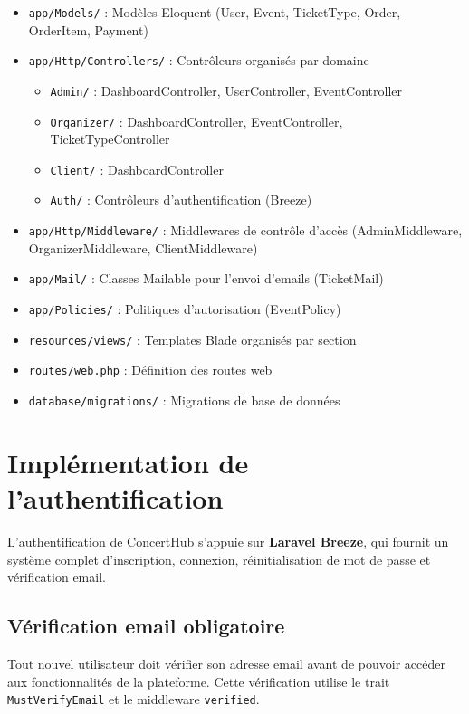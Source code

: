 \documentclass[a4paper,12pt,twoside]{report}
\begin{document}
\begin{itemize}
    \item \texttt{app/Models/} : Modèles Eloquent (User, Event, TicketType, Order, OrderItem, Payment)
    \item \texttt{app/Http/Controllers/} : Contrôleurs organisés par domaine
    \begin{itemize}
        \item \texttt{Admin/} : DashboardController, UserController, EventController
        \item \texttt{Organizer/} : DashboardController, EventController, TicketTypeController
        \item \texttt{Client/} : DashboardController
        \item \texttt{Auth/} : Contrôleurs d'authentification (Breeze)
    \end{itemize}
    \item \texttt{app/Http/Middleware/} : Middlewares de contrôle d'accès (AdminMiddleware, OrganizerMiddleware, ClientMiddleware)
    \item \texttt{app/Mail/} : Classes Mailable pour l'envoi d'emails (TicketMail)
    \item \texttt{app/Policies/} : Politiques d'autorisation (EventPolicy)
    \item \texttt{resources/views/} : Templates Blade organisés par section
    \item \texttt{routes/web.php} : Définition des routes web
    \item \texttt{database/migrations/} : Migrations de base de données
\end{itemize}

\section{Implémentation de l'authentification}

L'authentification de ConcertHub s'appuie sur \textbf{Laravel Breeze}, qui fournit un système complet d'inscription, connexion, réinitialisation de mot de passe et vérification email.

\subsection{Vérification email obligatoire}

Tout nouvel utilisateur doit vérifier son adresse email avant de pouvoir accéder aux fonctionnalités de la plateforme. Cette vérification utilise le trait \texttt{MustVerifyEmail} et le middleware \texttt{verified}.
\end{document}
